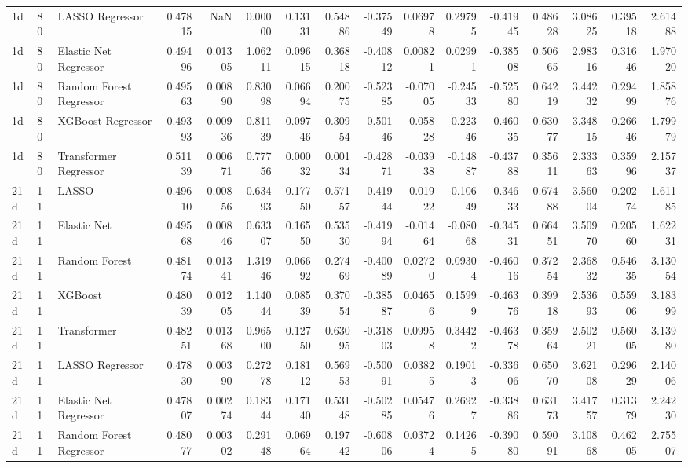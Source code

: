 \begin{tabular}{lllrrrrrrrrrrrrr}
1d & 80 & LASSO Regressor & 0.47815 & NaN & 0.00000 & 0.13131 & 0.54886 & -0.37549 & 0.06978 & 0.29795 & -0.41945 & 0.48628 & 3.08625 & 0.39518 & 2.61488 \\
1d & 80 & Elastic Net Regressor & 0.49496 & 0.01305 & 1.06211 & 0.09615 & 0.36818 & -0.40812 & 0.00821 & 0.02991 & -0.38508 & 0.50665 & 2.98316 & 0.31646 & 1.97020 \\
1d & 80 & Random Forest Regressor & 0.49563 & 0.00890 & 0.83098 & 0.06694 & 0.20075 & -0.52385 & -0.07005 & -0.24533 & -0.52580 & 0.64219 & 3.44232 & 0.29499 & 1.85876 \\
1d & 80 & XGBoost Regressor & 0.49393 & 0.00936 & 0.81139 & 0.09746 & 0.30954 & -0.50146 & -0.05828 & -0.22346 & -0.46035 & 0.63077 & 3.34815 & 0.26646 & 1.79979 \\
1d & 80 & Transformer Regressor & 0.51139 & 0.00671 & 0.77756 & 0.00032 & 0.00134 & -0.42871 & -0.03938 & -0.14887 & -0.43788 & 0.35611 & 2.33363 & 0.35996 & 2.15737 \\
21d & 11 & LASSO & 0.49610 & 0.00856 & 0.63493 & 0.17750 & 0.57157 & -0.41944 & -0.01922 & -0.10649 & -0.34633 & 0.67488 & 3.56004 & 0.20274 & 1.61185 \\
21d & 11 & Elastic Net & 0.49568 & 0.00846 & 0.63307 & 0.16550 & 0.53530 & -0.41994 & -0.01464 & -0.08068 & -0.34531 & 0.66451 & 3.50970 & 0.20560 & 1.62231 \\
21d & 11 & Random Forest & 0.48174 & 0.01341 & 1.31946 & 0.06692 & 0.27469 & -0.40089 & 0.02720 & 0.09304 & -0.46016 & 0.37254 & 2.36832 & 0.54635 & 3.13054 \\
21d & 11 & XGBoost & 0.48039 & 0.01205 & 1.14044 & 0.08539 & 0.37054 & -0.38587 & 0.04656 & 0.15999 & -0.46376 & 0.39918 & 2.53693 & 0.55906 & 3.18399 \\
21d & 11 & Transformer & 0.48251 & 0.01368 & 0.96500 & 0.12750 & 0.63095 & -0.31803 & 0.09958 & 0.34422 & -0.46378 & 0.35964 & 2.50221 & 0.56005 & 3.13980 \\
21d & 11 & LASSO Regressor & 0.47830 & 0.00390 & 0.27278 & 0.18112 & 0.56953 & -0.50091 & 0.03825 & 0.19013 & -0.33606 & 0.65070 & 3.62108 & 0.29629 & 2.14006 \\
21d & 11 & Elastic Net Regressor & 0.47807 & 0.00274 & 0.18344 & 0.17140 & 0.53148 & -0.50285 & 0.05476 & 0.26927 & -0.33886 & 0.63173 & 3.41757 & 0.31379 & 2.24230 \\
21d & 11 & Random Forest Regressor & 0.48077 & 0.00302 & 0.29148 & 0.06964 & 0.19742 & -0.60806 & 0.03724 & 0.14265 & -0.39080 & 0.59091 & 3.10868 & 0.46205 & 2.75507 \\

\end{tabular}
